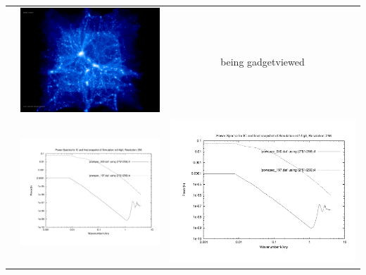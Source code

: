 \documentclass[a4paper,11pt,fleqn,oneside]{book}
\begin{document}
\begin{itemize}
\begin{table}[p]
\begin{tabular}{l|c|c}
 & \includegraphics[scale=0.075]{r256/h70/rst14lg3/197.jpg} & being gadgetviewed \\
 & \includegraphics[scale=0.25]{r256/h70/rst14lg3/plot_powspec_rst14lg3.pdf} & \includegraphics[scale=0.25]{r256/h100/rst14lg3/plot_powspec_rst14lg3.pdf} \\

\end{tabular}
\end{table}
\end{itemize}
\end{document}
